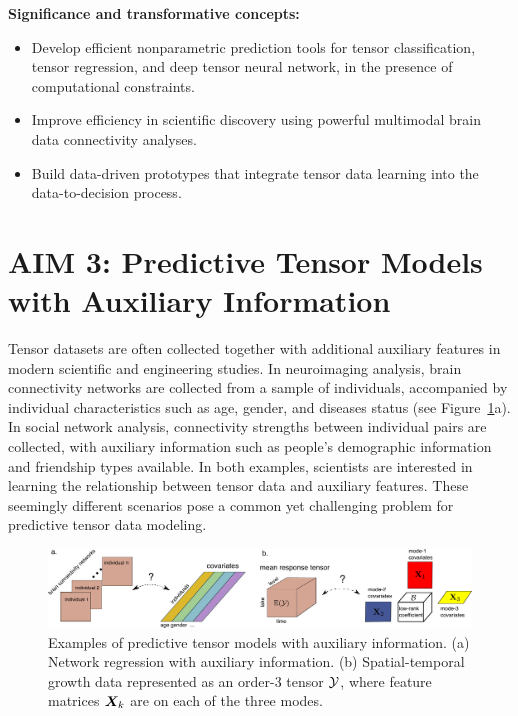 \documentclass[11pt]{article}
\DeclareRobustCommand{\mybox}[2][gray!20]{%
\begin{tcolorbox}[   %
        breakable,
        left=0pt,
        right=0pt,
        top=0pt,
        bottom=0pt,
        colback=#1,
        colframe=#1,
        width=\dimexpr\textwidth\relax, 
        enlarge left by=0mm,
        boxsep=5pt,
        arc=0pt,outer arc=0pt,
        ]
        #2
\end{tcolorbox}}
\DeclareRobustCommand{\mybox}[2][gray!20]{%
\begin{tcolorbox}[   %
        breakable,
        left=0pt,
        right=0pt,
        top=0pt,
        bottom=0pt,
        colback=#1,
        colframe=#1,
        width=\dimexpr\textwidth\relax, 
        enlarge left by=0mm,
        boxsep=5pt,
        arc=0pt,outer arc=0pt,
        ]
        #2
\end{tcolorbox}
}
\theoremstyle{exampstyle}
\theoremstyle{definition}
\begin{document}
 
\mybox[gray!20]{{\bf Significance and transformative concepts:} 
\begin{itemize}[leftmargin=*]
\item Develop efficient nonparametric prediction tools for tensor classification, tensor regression, and deep tensor neural network, in the presence of computational constraints.
\item Improve efficiency in scientific discovery using powerful multimodal brain data connectivity analyses. 
\item Build data-driven prototypes that integrate tensor data learning into the data-to-decision process. 
\end{itemize}
}

\vspace{-.3cm}
\section{AIM 3: Predictive Tensor Models with Auxiliary Information}\label{sec:theme3}
\vspace{-.5cm}
Tensor datasets are often collected together with additional auxiliary features in modern scientific and engineering studies. In neuroimaging analysis, brain connectivity networks are collected from a sample of individuals, accompanied by individual characteristics such as age, gender, and diseases status (see Figure~\ref{fig:intro1}a). In social network analysis, connectivity strengths between individual pairs are collected, with auxiliary information such as people’s demographic information and friendship types available. In both examples, scientists are interested in learning the relationship between tensor data and auxiliary features. These seemingly different scenarios pose a common yet challenging problem for predictive tensor data modeling. 

\begin{figure}[http]
\begin{center}
\includegraphics[width=16cm]{demo.pdf}
\end{center}
\caption{Examples of predictive tensor models with auxiliary information. (a) Network regression with auxiliary information. (b) Spatial-temporal growth data represented as an order-3 tensor $\mathcal{Y}$, where feature matrices $\bm X_k$ are on each of the three modes.}\label{fig:intro1}
\vspace{-.2cm}
\end{figure}
\end{document}
